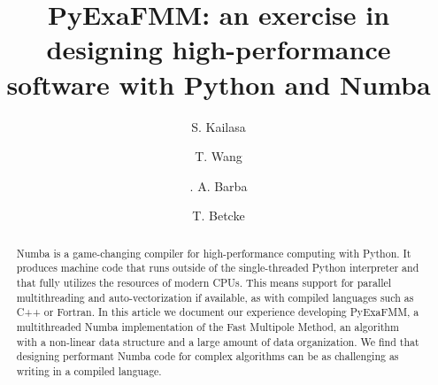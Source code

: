 \documentclass{IEEEcsmag}
\begin{document}

\title{PyExaFMM: an exercise in designing high-performance software with Python and Numba}

\author{S. Kailasa}

\author{T. Wang}

\author{. A. Barba}

\author{T. Betcke}


\begin{abstract}
   Numba is a game-changing compiler for high-performance computing with Python. It produces machine code that runs outside of the single-threaded Python interpreter and that fully utilizes the resources of modern CPUs. This means support for parallel multithreading and auto-vectorization if available, as with compiled languages such as C++ or Fortran. In this article we document our experience developing PyExaFMM, a multithreaded Numba implementation of the Fast Multipole Method, an algorithm with a non-linear data structure and a large amount of data organization. We find that designing performant Numba code for complex algorithms can be as challenging as writing in a compiled language.
\end{abstract}
\end{document}
